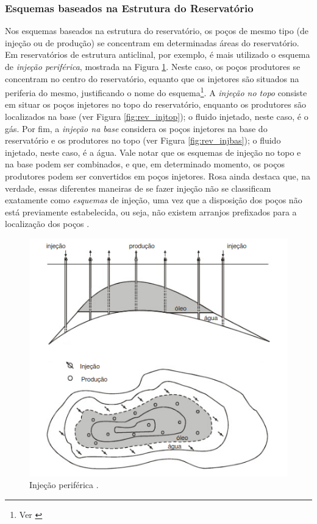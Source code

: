 \subsubsection{Esquemas baseados na Estrutura do Reservat\'{o}rio}
Nos esquemas baseados na estrutura do reservat\'{o}rio, os po\c{c}os de mesmo tipo (de inje\c{c}\~{a}o ou de produ\c{c}\~{a}o) se concentram em determinadas \'{a}reas do reservat\'{o}rio. Em reservat\'{o}rios de estrutura anticlinal, por exemplo, \'{e} mais utilizado o esquema de \textit{inje\c{c}\~{a}o perif\'{e}rica}, mostrada na Figura \ref{fig:rev_injper}. Neste caso, os po\c{c}os produtores se concentram no centro do reservat\'{o}rio, equanto que os injetores s\~{a}o situados na periferia do mesmo, justificando o nome do esquema\footnote{Ver \cite[p. 565]{engres}}. A \textit{inje\c{c}\~{a}o no topo} consiste em situar os po\c{c}os injetores no topo do reservat\'{o}rio, enquanto os produtores s\~{a}o localizados na base (ver Figura \ref{fig:rev_injtop}); o fluido injetado, neste caso, \'{e} o g\'{a}s. Por fim, a \textit{inje\c{c}\~{a}o na base} considera os po\c{c}os injetores na base do reservat\'{o}rio e os produtores no topo (ver Figura \ref{fig:rev_injbas}); o fluido injetado, neste caso, \'{e} a \'{a}gua. Vale notar que os esquemas de inje\c{c}\~{a}o no topo e na base podem ser combinados, e que, em determinado momento, os po\c{c}os produtores podem ser convertidos em po\c{c}os injetores. Rosa ainda destaca que, na verdade, essas diferentes maneiras de se fazer inje\c{c}\~{a}o n\~{a}o se classificam exatamente como
\textit{esquemas} de inje\c{c}\~{a}o, uma vez que a disposi\c{c}\~{a}o dos po\c{c}os n\~{a}o est\'{a} previamente estabelecida, ou seja, n\~{a}o existem arranjos prefixados para a localiza\c{c}\~{a}o dos po\c{c}os \cite[p. 566]{engres}.

\begin{figure}[!ht]
\centering
\includegraphics[width=.6\textwidth]{figs/revisao/revisao_injper.png}
\caption{Inje\c{c}\~{a}o perif\'{e}rica \cite[p. 565]{engres}.}
\label{fig:rev_injper}
\end{figure}

